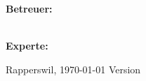 \begin{titlepage}
\begin{flushleft}
		\textbf{\LARGE Betreuer:}\\
		\Large \proff\\
		\vspace{0.5cm}
		
		\textbf{\LARGE Experte:}\\
		\Large \proff
		\vspace{0.5cm}
		
		\vspace{1.5cm}
		 Rapperswil, \today
		\hfill
		Version \version
	\end{flushleft}

\end{titlepage}

\restoregeometry
